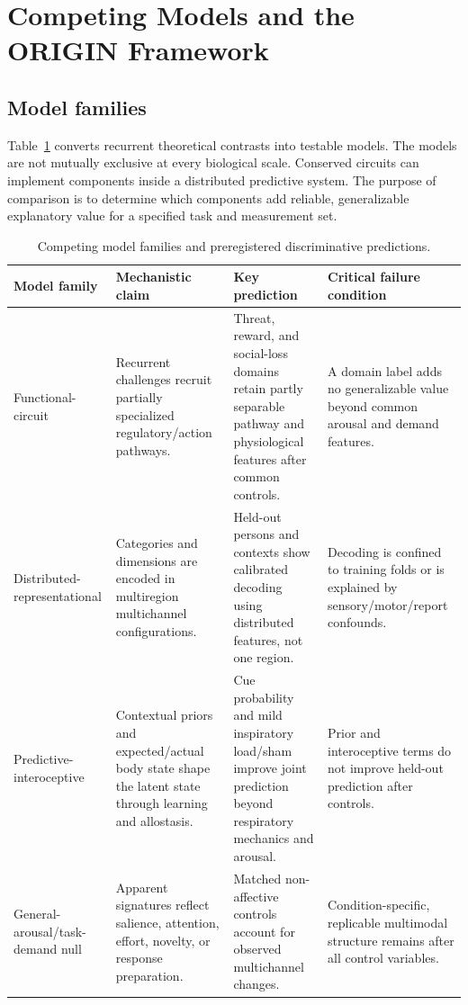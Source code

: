 \documentclass[conference]{IEEEtran}
\begin{document}
\section{Competing Models and the ORIGIN Framework}

\subsection{Model families}

Table~\ref{tab:models} converts recurrent theoretical contrasts into testable models. The models are not mutually exclusive at every biological scale. Conserved circuits can implement components inside a distributed predictive system. The purpose of comparison is to determine which components add reliable, generalizable explanatory value for a specified task and measurement set.

\begin{table}[!t]
\caption{Competing model families and preregistered discriminative predictions.}\label{tab:models}
\centering
\footnotesize
\begin{tabular}{p{}p{}p{}p{}}
\toprule
Model family & Mechanistic claim & Key prediction & Critical failure condition \\
\midrule
Functional-circuit & Recurrent challenges recruit partially specialized regulatory/action pathways. & Threat, reward, and social-loss domains retain partly separable pathway and physiological features after common controls. & A domain label adds no generalizable value beyond common arousal and demand features. \\
Distributed-representational & Categories and dimensions are encoded in multiregion multichannel configurations. & Held-out persons and contexts show calibrated decoding using distributed features, not one region. & Decoding is confined to training folds or is explained by sensory/motor/report confounds. \\
Predictive-interoceptive & Contextual priors and expected/actual body state shape the latent state through learning and allostasis. & Cue probability and mild inspiratory load/sham improve joint prediction beyond respiratory mechanics and arousal. & Prior and interoceptive terms do not improve held-out prediction after controls. \\
General-arousal/task-demand null & Apparent signatures reflect salience, attention, effort, novelty, or response preparation. & Matched non-affective controls account for observed multichannel changes. & Condition-specific, replicable multimodal structure remains after all control variables. \\
\bottomrule
\end{tabular}
\end{table}
\end{document}
